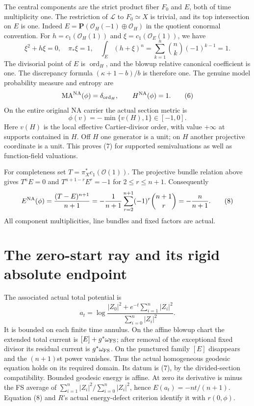 \documentclass[10pt]{article}
\newcommand{\MA}{\operatorname{MA}}
\newcommand{\PP}{\mathbf P}
\begin{document}
The central components are the strict product fiber $F_0$ and $E$,
both of time multiplicity one. The restriction of $\mathcal L$ to
$F_0\simeq X$ is trivial, and its top intersection on $E$ is one.
Indeed $E=\PP(\mathcal O_H(-1)\oplus\mathcal O_H)$ in the quotient
conormal convention. For $h=c_1(\mathcal O_H(1))$ and
$\xi=c_1(\mathcal O_E(1))$, we have
\[
 \xi^2+h\xi=0,\quad \pi_*\xi=1,\quad
 \int_E(h+\xi)^n=\sum_{k=1}^n\binom nk(-1)^{k-1}=1.
\]
The divisorial point of $E$ is $\operatorname{ord}_H$, and the blowup
relative canonical coefficient is one. The discrepancy formula
$(\kappa+1-b)/b$ is therefore one. The genuine model probability
measure and entropy are
\[
 \MA^{\rm NA}(\phi)=\delta_{\operatorname{ord}_H},
                         \qquad H^{\rm NA}(\phi)=1.      \tag{6}
\]
On the entire original NA carrier the actual section metric is
\[
                    \phi(v)=-\min\{v(H),1\}\in[-1,0].   \tag{7}
\]
Here $v(H)$ is the local effective Cartier-divisor order, with value
$+\infty$ at supports contained in $H$. Off $H$ one generator is a
unit; on $H$ another projective coordinate is a unit. This proves
(7) for supported semivaluations as well as function-field valuations.

For completeness set $T=\pi_X^*c_1(\mathcal O(1))$. The projective
bundle relation above gives $T^nE=0$ and
$T^{n+1-r}E^r=-1$ for $2\leq r\leq n+1$.
Consequently
\[
 E^{\rm NA}(\phi)=\frac{(T-E)^{n+1}}{n+1}
 =-\frac1{n+1}\sum_{r=2}^{n+1}(-1)^r\binom{n+1}r
 =-\frac n{n+1}.                                      \tag{8}
\]
All component multiplicities, line bundles and fixed factors are actual.

\section{The zero-start ray and its rigid absolute endpoint}
The associated actual total potential is
\[
 a_t=\log\frac{|Z_0|^2+e^{-t}\sum_{i=1}^n|Z_i|^2}
                       {\sum_{i=0}^n|Z_i|^2}.          \tag{9}
\]
It is bounded on each finite time annulus. On the affine blowup chart
the extended total current is $[E]+g^*\omega_{\rm FS}$; after removal
of the exceptional fixed divisor its residual current is
$g^*\omega_{\rm FS}$. On the punctured family $[E]$ disappears
and the $(n+1)$st power vanishes. Thus the actual homogeneous
geodesic equation holds on its required domain.
Its datum is (7), by the divided-section compatibility. Bounded
geodesic energy is affine. At zero its derivative is minus the FS
average of $\sum_{i=1}^n|Z_i|^2/\sum_{i=0}^n|Z_i|^2$, hence
$E(a_t)=-nt/(n+1)$. Equation (8) and $R$'s actual energy-defect
criterion identify it with $r(0,\phi)$.
\end{document}
